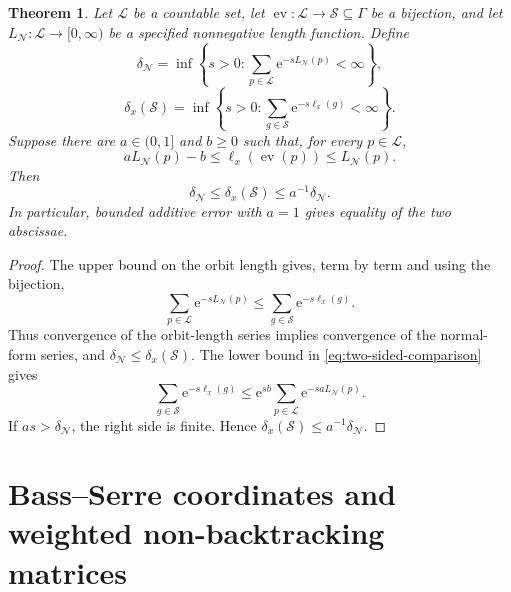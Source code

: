 \documentclass[11pt]{article}
\newtheorem{theorem}{Theorem}[section]
\theoremstyle{definition}
\newcommand{\e}{\mathrm e}
\begin{document}
\begin{theorem}
\label{thm:two-sided-comparison}
Let $\mathcal L$ be a countable set, let
$\operatorname{ev}:\mathcal L\to\mathscr S\subseteq\Gamma$ be a bijection, and let
$L_{\mathcal N}:\mathcal L\to[0,\infty)$ be a specified nonnegative length function.  Define
\[
 \delta_{\mathcal N}=
 \inf\left\{s>0:\sum_{p\in\mathcal L}\e^{-sL_{\mathcal N}(p)}<\infty\right\},
\]
\[
 \delta_x(\mathscr S)=
 \inf\left\{s>0:\sum_{g\in\mathscr S}\e^{-s\ell_x(g)}<\infty\right\}.
\]
Suppose there are $a\in(0,1]$ and $b\ge0$ such that, for every $p\in\mathcal L$,
\begin{equation}\label{eq:two-sided-comparison}
 aL_{\mathcal N}(p)-b\le
 \ell_x(\operatorname{ev}(p))\le L_{\mathcal N}(p).
\end{equation}
Then
\begin{equation}\label{eq:two-sided-exponents}
 \delta_{\mathcal N}\le\delta_x(\mathscr S)\le a^{-1}\delta_{\mathcal N}.
\end{equation}
In particular, bounded additive error with $a=1$ gives equality of the two abscissae.
\end{theorem}

\begin{proof}
The upper bound on the orbit length gives, term by term and using the bijection,
\[
 \sum_{p\in\mathcal L}\e^{-sL_{\mathcal N}(p)}
 \le
 \sum_{g\in\mathscr S}\e^{-s\ell_x(g)}.
\]
Thus convergence of the orbit-length series implies convergence of the normal-form series,
and $\delta_{\mathcal N}\le\delta_x(\mathscr S)$.  The lower bound in
\eqref{eq:two-sided-comparison} gives
\[
 \sum_{g\in\mathscr S}\e^{-s\ell_x(g)}
 \le\e^{sb}\sum_{p\in\mathcal L}\e^{-saL_{\mathcal N}(p)}.
\]
If $as>\delta_{\mathcal N}$, the right side is finite.  Hence
$\delta_x(\mathscr S)\le a^{-1}\delta_{\mathcal N}$.
\end{proof}

\section{Bass--Serre coordinates and weighted non-backtracking matrices}
\label{sec:bass-serre}
\end{document}
